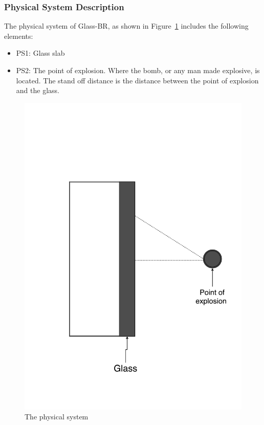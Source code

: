 \documentclass[12pt]{article}
\newcommand{\progname}{Glass-BR}
\begin{document}
\subsubsection{Physical System Description}

The physical system of \progname, as shown in Figure~\ref{Fig_PhysSyst} includes
the following elements:
\begin{itemize}
\item{PS1:} Glass slab
\item{PS2:} The point of explosion.  Where the bomb, or any man made explosive,
  is located. The stand off distance is the distance between the point of
  explosion and the glass.
\end{itemize}
 
\begin{figure}[h!]
  \begin{center}
    \includegraphics[scale=0.25]{physicalsystimage.pdf}
    \caption{The physical system}
    \label{Fig_PhysSyst}
  \end{center}
\end{figure}
\end{document}
